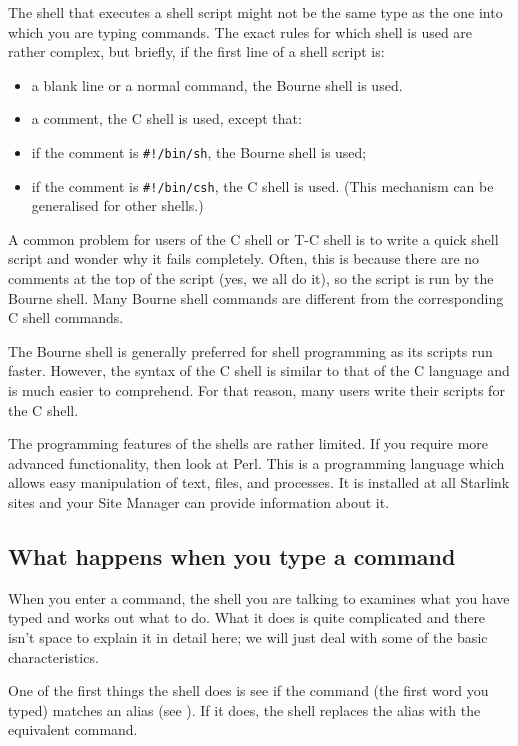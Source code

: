 \documentclass[twoside,11pt,nolof]{starlink}
\begin{document}
The shell that executes a shell script might not be the same type as the one
into which you are typing commands.
The exact rules for which shell is used are rather complex, but briefly, if the
first line of a shell script is:
\begin{itemize}
\item a blank line or a normal command, the Bourne shell is used.
\item a comment, the C shell is used, except that:
\item if the comment is \texttt{\#!/bin/sh}, the Bourne shell is used;
\item if the comment is \texttt{\#!/bin/csh}, the C shell is used.\newline
(This mechanism can be generalised for other shells.)
\end{itemize}
A common problem for users of the C shell or T-C shell is to write a quick
shell script and wonder why it fails completely.
Often, this is because there are no comments at the top of the script (yes,
we all do it), so the script is run by the Bourne shell.
Many Bourne shell commands are different from the corresponding C shell
commands.

The Bourne shell is generally preferred for shell programming as
its scripts run faster. However, the syntax of the C shell
is similar to that of the C language and is much easier to comprehend.
For that reason, many users write their scripts for the C shell.

The programming features of the shells are rather limited. If you require
more advanced functionality, then look at Perl. This is a programming
language which allows easy manipulation of text, files, and processes.
It is installed at all Starlink sites and your Site Manager can provide
information about it.

\subsection{What happens when you type a command}

When you enter a command, the shell you are talking to examines what you have
typed and works out what to do.
What it does is quite complicated and there isn't space to explain it in detail
here; we will just deal with some of the basic characteristics.

One of the first things the shell does is see if the command (the first word
you typed) matches an alias (see ).
If it does, the shell replaces the alias with the equivalent command.
\end{document}
